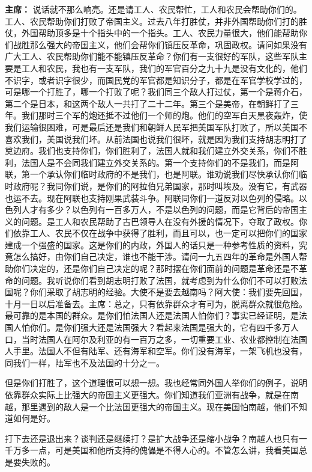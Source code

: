 \begin{duihua}
\item[\textbf{主席：}] 说话就不那么响亮。还是请工人、农民帮忙，工人和农民会帮助你们的。工人、农民帮助你们打败了帝国主义。过去八年打胜仗，并非外国帮助你们打的胜仗，外国帮助顶多是十个指头中的一个指头。工人、农民力量很大，他们能帮助你们战胜那么强大的帝国主义，他们会帮你们镇压反革命，巩固政权。请问如果没有广大工人、农民帮助你们能不能镇压反革命？你们有一支很好的军队，这些军队主要是工人和农民，我也有一支军队，我们的军官百分之九十九是没有文化的，他们不识字，或者识字很少，而国民党的军官都是知识分子，都是在军官学校学过的，可是哪一个打胜了，哪一个打败了呢？我们同三个敌人打过仗，第一个是蒋介石，第二个是日本，和这两个敌人一共打了二十二年。第三个是美帝，在朝鲜打了三年。我们那时三个军的炮还抵不过他们一个师的炮。他们的空军白天黑夜轰炸，使我们运输很困难，可是最后还是我们和朝鲜人民军把美国军队打败了，所以美国不喜欢我们，美国说我们坏。从前法国也说我们很坏，就是因为我们支持胡志明打了奠边府。我们也支持你们，你们胜利了，法国人就和我们建立外交关系，你们不胜利，法国人是不会同我们建立外交关系的。第一个支持你们的不是我们，而是阿联，第一个承认你们临时政府的不是我们，也是阿联。谁劝说我们尽快承认你们临时政府呢？我同你们说，是你们的阿拉伯兄弟国家，那时叫埃及。没有它，有武器也运不去。现在阿联也支持刚果武装斗争。阿联同你们一道反对以色列的侵略。以色列人才有多少？以色列有一百多万人，不是以色列的问题，而是它背后的帝国主义的问题。是工人和农民帮助了古巴领导人在没有外援的情况下，夺取了政权。你们依靠工人、农民不仅在战争中获得了胜利，而且可以，也一定可以把你们的国家建成一个强盛的国家。这是你们的内政，外国人的话只是一种参考性质的资料，究竟怎么搞好，由你们自己决定，谁也不能干涉。请问一九五四年的革命是外国人帮助你们决定的，还是你们自己决定的呢？那时摆在你们面前的问题是革命还是不革命的问题。我听说你们看到胡志明打败了法国，就考虑到为什么你们不可以打败法国呢？你们采取了胡志明的经验。大使不是要去越南吗？阿大使：我们要先回国，十月一日以后准备去。主席：总之，只有依靠群众才有可为，脱离群众就很危险。最可靠的是本国的群众。是你们怕法国人还是法国人怕你们？事实已经证明，是法国人怕你们。是你们强大还是法国强大？看起来法国是强大的，它有四千多万人口，当时法国人在阿尔及利亚的有一百万之多，一切重要工业、农业都控制在法国人手里。法国人不但有陆军、还有海军和空军。你们没有海军，一架飞机也没有，同我们一样，陆军也不及法国的十分之一。

但是你们打胜了，这个道理很可以想一想。我也经常同外国人举你们的例子，说明依靠群众实际上比强大的帝国主义更强大。你们知道我们亚洲有战争，就是在南越，那里遇到的敌人是一个比法国更强大的帝国主义。现在美国怕南越，他们不知道如何是好。

打下去还是退出来？谈判还是继续打？是扩大战争还是缩小战争？南越人也只有一千万多一点，可是美国和他所支持的傀儡是不得人心的。不管怎么讲，我看美国总是要失败的。


\end{duihua}
